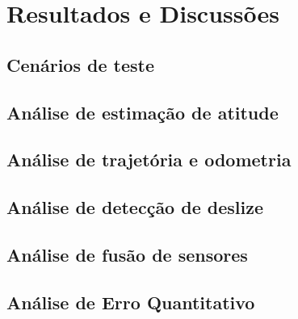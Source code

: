 \chapter{Resultados e Discussões}

\section{Cenários de teste}

\section{Análise de estimação de atitude}

\section{Análise de trajetória e odometria}

\section{Análise de detecção de deslize}

\section{Análise de fusão de sensores}

\section{Análise de Erro Quantitativo}